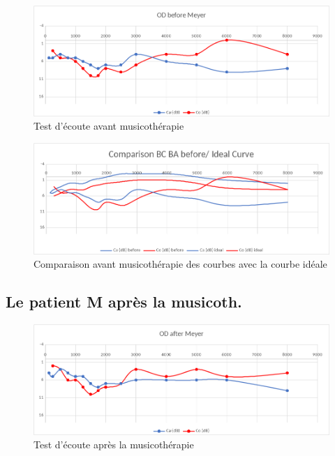  	
 	\begin{figure}[tbh]
 		\centering
 		\includegraphics[width=0.7\linewidth]{images/clinique/od_before_meyer.png}
 		\caption{Test d'écoute avant musicothérapie}
 		\label{fig:odbeforemeyer}
 	\end{figure}
 	
 	\lipsum[1]
 	
 	
 	
 	
 	\begin{figure}
 		\centering
 		\includegraphics[width=0.7\linewidth]{images/clinique/comparison_bc_ba_before_vs_ideal_curve_meyer.png}
 		\caption[Comparaison avec la courbe idéale]{Comparaison avant
                  musicothérapie des
                  courbes  avec la courbe idéale}
 		\label{fig:comparisonbcbabeforevsidealcurvemeyer}
 	\end{figure}
 	
 	
 	\subsection{Le patient M après la musicoth.}
 	\lipsum[1]
 	\begin{figure}[h]
 		\centering

 		\includegraphics[width=0.7\linewidth]{images/clinique/od_after_meyer.png}
 		\caption{Test d'écoute après la musicothérapie}
 		\label{fig:odaftermeyer}
 	\end{figure}
 
